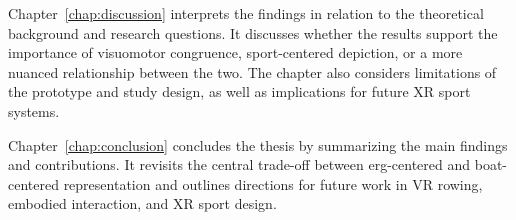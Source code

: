 Chapter~\ref{chap:discussion} interprets the findings in relation to the theoretical background and research questions. It discusses whether the results support the importance of visuomotor congruence, sport-centered depiction, or a more nuanced relationship between the two. The chapter also considers limitations of the prototype and study design, as well as implications for future XR sport systems.

Chapter~\ref{chap:conclusion} concludes the thesis by summarizing the main findings and contributions. It revisits the central trade-off between erg-centered and boat-centered representation and outlines directions for future work in VR rowing, embodied interaction, and XR sport design.